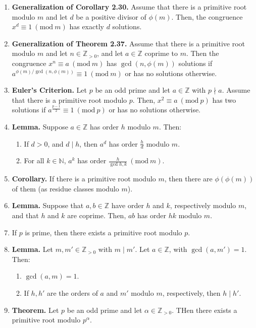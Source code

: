 \documentclass[11pt]{article}
\theoremstyle{definition}
\theoremstyle{named}
\newcommand{\Mod}[1]{\ (\mathrm{mod}\ #1)}
\begin{document}
\begin{enumerate}
\begin{enumerate}
    \end{enumerate}
    \item \textbf{Generalization of Corollary 2.30. } Assume that there is a primitive root modulo $m$ and let $d$ be a positive divisor of $\phi(m)$. Then, the congruence $x^d \equiv 1 \Mod{m}$ has exactly $d$ solutions. 
    \item \textbf{Generalization of Theorem 2.37. } Assume that there is a primitive root modulo $m$ and let $n \in \mathbb{Z}_{>0}$, and let $a \in \mathbb{Z}$ coprime to $m$. Then the congruence $x^n \equiv a \Mod{m}$ has $\gcd(n,\phi(m))$ solutions if $a^{\phi(m)/\gcd(n,\phi(m))} \equiv 1 \Mod{m}$ or has no solutions otherwise. 
    \item \textbf{Euler's Criterion. } Let $p$ be an odd prime and let $a \in \mathbb{Z}$ with $p \nmid a$. Assume that there is a primitive root modulo $p$. Then, $x^2 \equiv a \Mod{p}$ has two solutions if $a^{\frac{p-1}{2}} \equiv 1 \Mod{p}$ or has no solutions otherwise. 
    \item \textbf{Lemma. } Suppose $a \in \mathbb{Z}$ has order $h$ modulo $m$. Then: 
    \begin{enumerate}
        \item If $d>0$, and $d \mid h$, then $a^d$ has order $\frac{h}{d}$ modulo $m$. 
        \item For all $k \in \mathbb{N}$, $a^k$ has order $\frac{h}{\gcd{h,k}} \Mod{m}$. 
    \end{enumerate}
    \item \textbf{Corollary. } If there is a primitive root modulo $m$, then there are $\phi(\phi(m))$ of them (as residue classes modulo $m$). 
    \item \textbf{Lemma. } Suppose that $a,b \in \mathbb{Z}$ have order $h$ and $k$, respectively modulo $m$, and that $h$ and $k$ are coprime. Then, $ab$ has order $hk$ modulo $m$. 
    \item If $p$ is prime, then there exists a primitive root modulo $p$. 
    \item \textbf{Lemma. } Let $m,m' \in \mathbb{Z}_{>0}$ with $m \mid m'$. Let $a \in \mathbb{Z}$, with $\gcd(a,m') = 1$. Then: 
    \begin{enumerate}
        \item $\gcd(a,m) = 1$. 
        \item If $h,h'$ are the orders of $a$ and $m'$ modulo $m$, respectively, then $h \mid h'$. 
    \end{enumerate}
    \item \textbf{Theorem. } Let $p$ be an odd prime and let $\alpha \in \mathbb{Z}_{>0}$. THen there exists a primitive root modulo $p^\alpha$. 

\end{enumerate}
\end{document}
